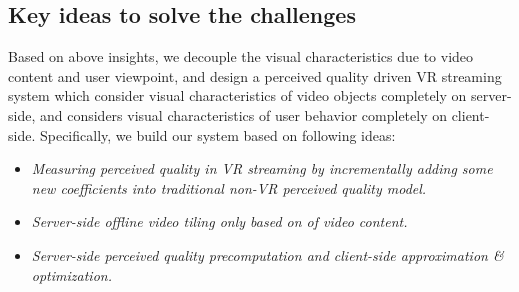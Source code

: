 \subsection{Key ideas to solve the challenges}

Based on above insights, we decouple the visual characteristics due to video content and user viewpoint, and design a perceived quality driven VR streaming system which consider visual characteristics of video objects completely on server-side, and considers visual characteristics of user behavior completely on client-side. Specifically, we build our system based on following ideas:

\begin{itemize}

\item \emph{Measuring perceived quality in VR streaming by incrementally adding some new coefficients into traditional non-VR perceived quality model.}

\item \emph{Server-side offline video tiling only based on of video content.}

\item \emph{Server-side perceived quality precomputation and client-side approximation \& optimization.}

\end{itemize}
